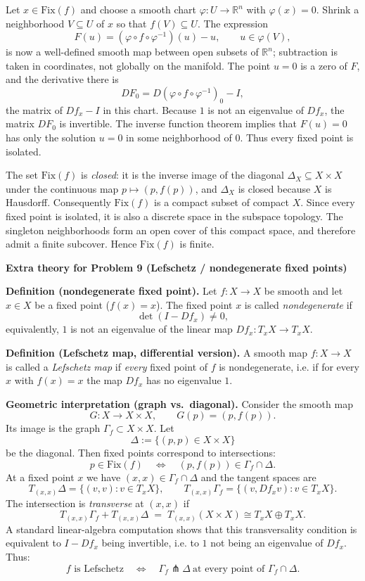 \begin{solution}
Let $x\in\mathrm{Fix}(f)$ and choose a smooth chart
$\varphi:U\to\mathbb R^n$ with $\varphi(x)=0$. Shrink a neighborhood
$V\subseteq U$ of $x$ so that $f(V)\subseteq U$. The expression
\[
F(u)=(\varphi\circ f\circ\varphi^{-1})(u)-u,
\qquad u\in\varphi(V),
\]
is now a well-defined smooth map between open subsets of $\mathbb R^n$;
subtraction is taken in coordinates, not globally on the manifold.
The point $u=0$ is a zero of $F$, and the derivative there is
\[
DF_0=D(\varphi\circ f\circ\varphi^{-1})_0-I,
\]
the matrix of $Df_x-I$ in this chart. Because $1$ is not an
eigenvalue of $Df_x$, the matrix $DF_0$ is invertible. The inverse
function theorem implies that $F(u)=0$ has only the solution $u=0$
in some neighborhood of $0$. Thus every fixed point is isolated.

The set $\mathrm{Fix}(f)$ is \emph{closed}: it is the inverse image of
the diagonal $\Delta_X\subseteq X\times X$ under the continuous map
$p\mapsto(p,f(p))$, and $\Delta_X$ is closed because $X$ is Hausdorff.
Consequently $\mathrm{Fix}(f)$ is a compact subset of compact $X$.
Since every fixed point is isolated, it is also a discrete space in
the subspace topology. The singleton neighborhoods form an open cover
of this compact space, and therefore admit a finite subcover.
Hence $\mathrm{Fix}(f)$ is finite.

\par\medskip\noindent\textbf{Extra theory for Problem 9 (Lefschetz / nondegenerate fixed points)}\par\smallskip


\noindent\textbf{Definition (nondegenerate fixed point).}
Let $f:X\to X$ be smooth and let $x\in X$ be a fixed point ($f(x)=x$).
The fixed point $x$ is called \emph{nondegenerate} if
\[
\det(I - Df_x)\neq 0,
\]
equivalently, $1$ is not an eigenvalue of the linear map $Df_x:T_xX\to T_xX$.

\medskip
\noindent\textbf{Definition (Lefschetz map, differential version).}
A smooth map $f:X\to X$ is called a \emph{Lefschetz map} if \emph{every} fixed point of $f$ is nondegenerate,
i.e. if for every $x$ with $f(x)=x$ the map $Df_x$ has no eigenvalue $1$.

\medskip
\noindent\textbf{Geometric interpretation (graph vs.\ diagonal).}
Consider the smooth map
\[
G:X\longrightarrow X\times X,\qquad G(p)=(p,f(p)).
\]
Its image is the graph $\Gamma_f\subset X\times X$. Let
\[
\Delta:=\{(p,p)\in X\times X\}
\]
be the diagonal. Then fixed points correspond to intersections:
\[
p\in \mathrm{Fix}(f)\quad \Longleftrightarrow\quad (p,f(p))\in \Gamma_f\cap \Delta.
\]
At a fixed point $x$ we have $(x,x)\in \Gamma_f\cap \Delta$ and the tangent spaces are
\[
T_{(x,x)}\Delta=\{(v,v): v\in T_xX\},
\qquad
T_{(x,x)}\Gamma_f=\{(v, Df_x v): v\in T_xX\}.
\]
The intersection is \emph{transverse} at $(x,x)$ if
\[
T_{(x,x)}\Gamma_f + T_{(x,x)}\Delta \;=\; T_{(x,x)}(X\times X)\cong T_xX\oplus T_xX.
\]
A standard linear-algebra computation shows that this transversality condition is equivalent to
$I-Df_x$ being invertible, i.e. to $1$ not being an eigenvalue of $Df_x$.
Thus:
\[
\text{$f$ is Lefschetz}
\quad \Longleftrightarrow\quad
\Gamma_f \pitchfork \Delta \ \text{at every point of } \Gamma_f\cap\Delta.
\]


\end{solution}
